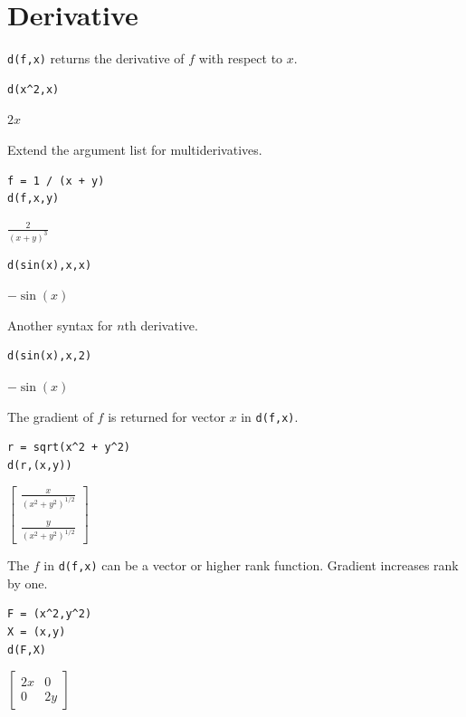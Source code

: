 \documentclass[12pt]{article}
\begin{document}
\newpage

\section{Derivative}

\verb$d(f,x)$ returns the derivative of $f$ with respect to $x$.

{\color{blue}
\begin{verbatim}
d(x^2,x)
\end{verbatim}}

$2x$

\bigskip
Extend the argument list for multiderivatives.

{\color{blue}
\begin{verbatim}
f = 1 / (x + y)
d(f,x,y)
\end{verbatim}}

$\displaystyle
\frac{2}{(x+y)^3}
$

{\color{blue}
\begin{verbatim}
d(sin(x),x,x)
\end{verbatim}}

$-\sin(x)$

\bigskip
Another syntax for $n$th derivative.

{\color{blue}
\begin{verbatim}
d(sin(x),x,2)
\end{verbatim}}

$-\sin(x)$

\bigskip
The gradient of $f$ is returned for vector $x$ in \verb$d(f,x)$.

{\color{blue}
\begin{verbatim}
r = sqrt(x^2 + y^2)
d(r,(x,y))
\end{verbatim}
}

$\displaystyle
\begin{bmatrix}
{\displaystyle \frac{x}{(x^2+y^2)^{1/2}}}
\\
\\
{\displaystyle \frac{y}{(x^2+y^2)^{1/2}}}
\end{bmatrix}
$

\bigskip
The $f$ in \verb$d(f,x)$ can be a vector or higher rank function.
Gradient increases rank by one.

{\color{blue}
\begin{verbatim}
F = (x^2,y^2)
X = (x,y)
d(F,X)
\end{verbatim}
}

$\displaystyle
\begin{bmatrix}
2x & 0
\\[1ex]
0 & 2y
\end{bmatrix}
$
\end{document}

